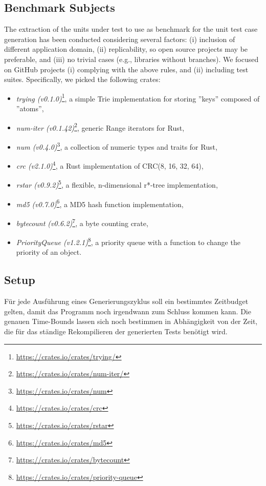 \documentclass{article}
\begin{document}
\subsection{Benchmark Subjects}
The extraction of the units under test to use as benchmark for the unit test case generation has been conducted considering several factors: (i) inclusion of different application domain, (ii) replicability, so open source projects may be preferable, and (iii) no trivial cases (e.g., libraries without branches). We focused on GitHub projects (i) complying with the above rules, and (ii) including test suites. Specifically, we picked the following crates:
\begin{itemize}
    \item \textit{trying (v0.1.0)}\footnote{\url{https://crates.io/crates/trying/}}, a simple Trie implementation for storing ''keys'' composed of ''atoms'',
    \item \textit{num-iter (v0.1.42)}\footnote{\url{https://crates.io/crates/num-iter/}}, generic Range iterators for Rust,
    \item \textit{num (v0.4.0)}\footnote{\url{https://crates.io/crates/num}}, a collection of numeric types and traits for Rust,
    \item \textit{crc (v2.1.0)}\footnote{\url{https://crates.io/crates/crc}}, a Rust implementation of CRC(8, 16, 32, 64),
    \item \textit{rstar (v0.9.2)}\footnote{\url{https://crates.io/crates/rstar}}, a flexible, n-dimensional r*-tree implementation,
    \item \textit{md5 (v0.7.0)}\footnote{\url{https://crates.io/crates/md5}}, a MD5 hash function implementation,
    \item \textit{bytecount (v0.6.2)}\footnote{\url{https://crates.io/crates/bytecount}}, a byte counting crate,
    \item \textit{PriorityQueue (v1.2.1)}\footnote{\url{https://crates.io/crates/priority-queue}}, a priority queue with a function to change the priority of an object.
\end{itemize}

\subsection{Setup}
Für jede Ausführung eines Generierungszyklus soll ein bestimmtes Zeitbudget gelten, damit das Programm noch irgendwann zum Schluss kommen kann. Die genauen Time-Bounds lassen sich noch bestimmen in Abhängigkeit von der Zeit, die für das ständige Rekompilieren der generierten Tests benötigt wird.
\end{document}
